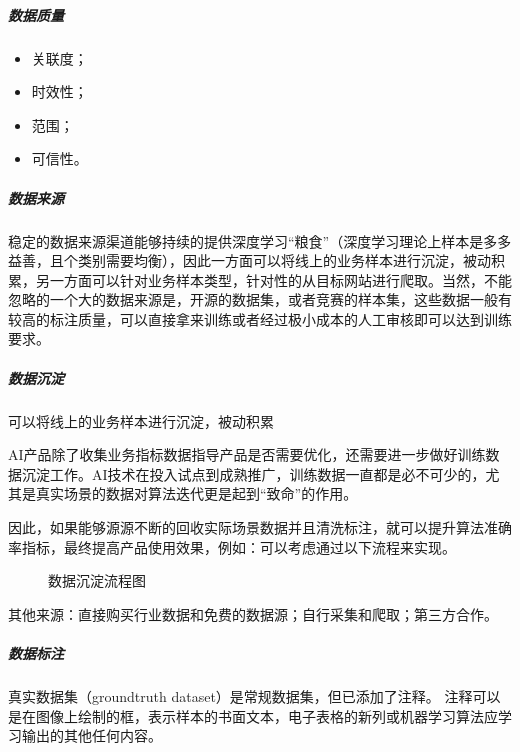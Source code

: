 \documentclass[letterpaper,11pt,english]{sphinxmanual}
\begin{document}
\subparagraph{数据质量}
\label{\detokenize{chapter_idea/data:id14}}\begin{itemize}
\item {} 
关联度；

\item {} 
时效性；

\item {} 
范围；

\item {} 
可信性。

\end{itemize}


\subparagraph{数据来源}
\label{\detokenize{chapter_idea/data:id15}}
稳定的数据来源渠道能够持续的提供深度学习“粮食”（深度学习理论上样本是多多益善，且个类别需要均衡），因此一方面可以将线上的业务样本进行沉淀，被动积累，另一方面可以针对业务样本类型，针对性的从目标网站进行爬取。当然，不能忽略的一个大的数据来源是，开源的数据集，或者竞赛的样本集，这些数据一般有较高的标注质量，可以直接拿来训练或者经过极小成本的人工审核即可以达到训练要求。


\subparagraph{数据沉淀}
\label{\detokenize{chapter_idea/data:id16}}
可以将线上的业务样本进行沉淀，被动积累

AI产品除了收集业务指标数据指导产品是否需要优化，还需要进一步做好训练数据沉淀工作。AI技术在投入试点到成熟推广，训练数据一直都是必不可少的，尤其是真实场景的数据对算法迭代更是起到“致命”的作用。

因此，如果能够源源不断的回收实际场景数据并且清洗标注，就可以提升算法准确率指标，最终提高产品使用效果，例如：可以考虑通过以下流程来实现。

\begin{figure}[H]
\centering
\capstart

\noindent{}
\caption{数据沉淀流程图}\label{\detokenize{chapter_idea/data:id28}}\end{figure}

其他来源：直接购买行业数据和免费的数据源；自行采集和爬取；第三方合作。


\subparagraph{数据标注}
\label{\detokenize{chapter_idea/data:id17}}
真实数据集（ground\sphinxhyphen{}truth dataset）是常规数据集，但已添加了注释。
注释可以是在图像上绘制的框，表示样本的书面文本，电子表格的新列或机器学习算法应学习输出的其他任何内容。%
\begin{footnote}[316]\sphinxAtStartFootnote
{}
%
\end{footnote}
\end{document}
